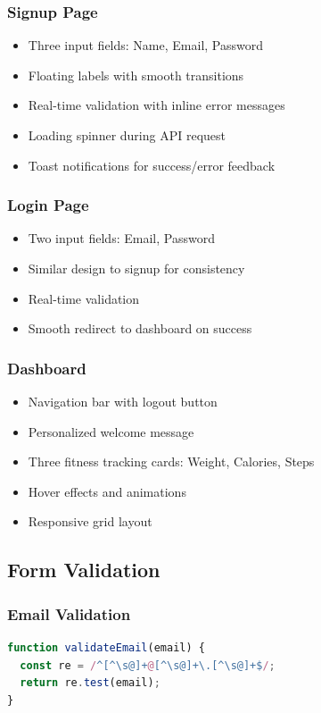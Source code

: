 \documentclass[12pt,a4paper]{article}
\begin{document}
\subsubsection{Signup Page}
\begin{itemize}
    \item Three input fields: Name, Email, Password
    \item Floating labels with smooth transitions
    \item Real-time validation with inline error messages
    \item Loading spinner during API request
    \item Toast notifications for success/error feedback
\end{itemize}

\subsubsection{Login Page}
\begin{itemize}
    \item Two input fields: Email, Password
    \item Similar design to signup for consistency
    \item Real-time validation
    \item Smooth redirect to dashboard on success
\end{itemize}

\subsubsection{Dashboard}
\begin{itemize}
    \item Navigation bar with logout button
    \item Personalized welcome message
    \item Three fitness tracking cards: Weight, Calories, Steps
    \item Hover effects and animations
    \item Responsive grid layout
\end{itemize}

\subsection{Form Validation}

\subsubsection{Email Validation}
\begin{lstlisting}[language=JavaScript]
function validateEmail(email) {
  const re = /^[^\s@]+@[^\s@]+\.[^\s@]+$/;
  return re.test(email);
}
\end{lstlisting}
\end{document}

